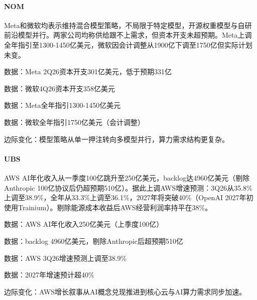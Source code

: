 \documentclass[11pt]{ctexart}
\begin{document}
\paragraph{NOM} Meta和微软均表示维持混合模型策略，不局限于特定模型，开源权重模型与自研前沿模型并行。两家公司均称供给跟不上需求，但资本开支未超预期。Meta上调全年指引至1300-1450亿美元，微软因会计调整从1900亿下调至1750亿但实际计划未变。
{\small\color{refgray}数据：Meta 2Q26资本开支301亿美元，低于预期331亿\par}
{\small\color{refgray}数据：微软4Q26资本开支358亿美元\par}
{\small\color{refgray}数据：Meta全年指引1300-1450亿美元\par}
{\small\color{refgray}数据：微软全年指引1750亿美元（会计调整）\par}
{\small\color{refgray}边际变化：模型策略从单一押注转向多模型并行，算力需求结构更复杂。\par}
\paragraph{UBS} AWS AI年化收入从一季度100亿跳升至250亿美元，backlog达4960亿美元（剔除Anthropic 100亿协议后仍超预期510亿）。据此上调AWS增速预测：3Q26从35.8\%上调至38.9\%，全年从33.3\%上调至36.1\%，2027年将突破40\%（OpenAI 2027年初使用Trainium）。剔除能源成本收益后AWS经营利润率持平在38\%。
{\small\color{refgray}数据：AWS AI年化收入250亿美元（上季度100亿）\par}
{\small\color{refgray}数据：backlog 4960亿美元，剔除Anthropic后超预期510亿\par}
{\small\color{refgray}数据：AWS 3Q26增速预测上调至38.9\%\par}
{\small\color{refgray}数据：2027年增速预计超40\%\par}
{\small\color{refgray}边际变化：AWS增长叙事从AI概念兑现推进到核心云与AI算力需求同步加速。\par}
\end{document}

